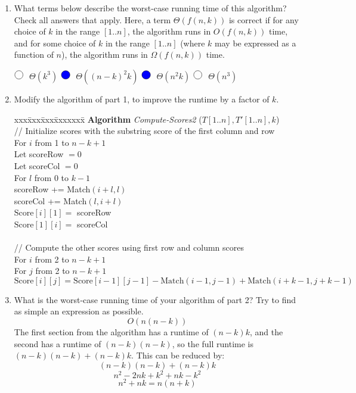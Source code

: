 \documentclass[11pt]{article}
\def\ans#1{{\color{ans}#1}}
\newcommand{\Match}{\mbox{Match}}
\newcommand{\Score}{\mbox{Score}}
\newcommand{\fillinMC}[1]{\fillinMCmath{\mbox{#1}}}
\newcommand{\fillinMCmath}[1]{\begin{tikzpicture}\draw circle [radius=0.5em];\end{tikzpicture}\ #1}
\newcommand{\fillinMCsoln}[1]{\fillinMCmathsoln{\mbox{#1}}}
\newcommand{\fillinMCmathsoln}[1]{\begin{tikzpicture}\draw[black, fill=blue] circle [radius=0.5em];\end{tikzpicture}\ #1}
\begin{document}
\begin{enumerate}
\item What terms below describe the worst-case running time of this
algorithm?  Check all answers that apply.  Here, a term
$\Theta(f(n,k))$ is correct if for any choice of $k$ in the range
$[1..n]$, the algorithm runs in $O(f(n,k))$ time, and for some
choice of $k$ in the range $[1..n]$ (where $k$ may be expressed as
a function of $n$), the algorithm runs in $\Omega(f(n,k))$ time.

$\fillinMC{}$ $\Theta(k^3)$ \hspace{.6in} 
$\fillinMCsoln{}$ $\Theta((n-k)^2 k)$   \hspace{.6in} 
$\fillinMCsoln{}$ $\Theta(n^2 k)$   \hspace{.6in} 
$\fillinMC{}$ $\Theta(n^3)$

\clearpage
\item Modify the algorithm of part 1, to improve the runtime by a factor of $k$.
\begin{tabbing}
  xxx\=xxx\=xxx\=xxxxxxx\= \kill \color{ans}
  {\bf Algorithm} {\em Compute-Scores2} ($T[1..n],T'[1..n],k$)\\ [0pt \color{ans}]
  \> // Initialize scores with the substring score of the first column and row \\
  \> For $i$ from 1 to $n-k+1$ \\
  \>\> Let scoreRow $= 0$ \\
  \>\> Let scoreCol $= 0$ \\
  \>\> For $l$ from 0 to $k-1$ \\
  \>\>\> scoreRow += Match$(i+l,l)$ \\
  \>\>\> scoreCol += Match$(l,i+l)$ \\
  \>\> $\Score[i][1] = $ scoreRow \\
  \>\> $\Score[1][i] = $ scoreCol \\ \\
  \> // Compute the other scores using first row and column scores \\
  \> For $i$ from 2 to $n-k+1$ \\
  \>\> For $j$ from 2 to $n-k+1$ \\
  \>\>\> $\Score[i][j] = \Score[i-1][j-1] - \Match(i-1,j-1) + \Match(i+k-1,j+k-1)$ \\

\end{tabbing}

\item What is the worst-case running time of your algorithm of part 2?
Try to find as simple an expression as possible. \\
\ans{
  \[ O(n(n-k)) \]
  The first section from the algorithm has a runtime of $(n-k)k$, and the second has a runtime 
  of $(n-k)(n-k)$, so the full runtime is $(n-k)(n-k) + (n-k)k$. This can be reduced by:\\
  \[
    (n-k)(n-k) + (n-k)k \]
  \[
    n^2 - 2nk + k^2 + nk - k^2
  \]
  \[
    n^2 + nk = n(n + k)
  \]
}
\end{enumerate}
\end{document}
